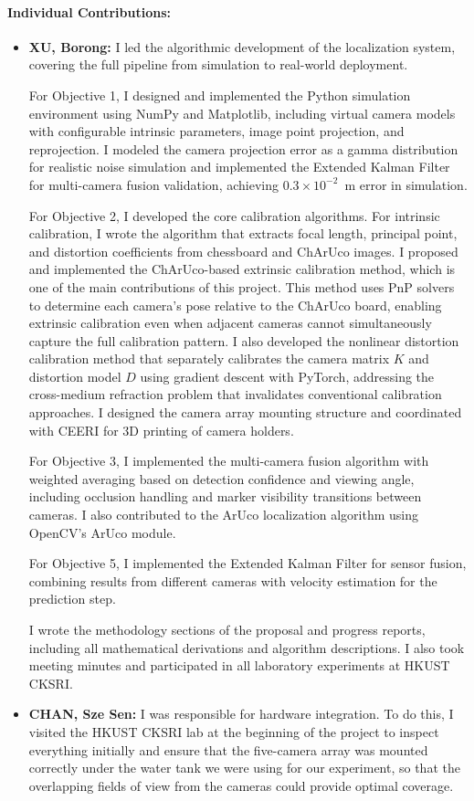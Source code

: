 \documentclass[11pt]{article}
\begin{document}
    \paragraph{Individual Contributions:}
    \begin{itemize}
        \item \textbf{XU, Borong:}
        I led the algorithmic development of the localization system, covering the full pipeline from simulation to real-world deployment.

        For Objective 1, I designed and implemented the Python simulation environment using NumPy and Matplotlib, including virtual camera models with configurable intrinsic parameters, image point projection, and reprojection. I modeled the camera projection error as a gamma distribution for realistic noise simulation and implemented the Extended Kalman Filter for multi-camera fusion validation, achieving $0.3\times10^{-2}$~m error in simulation.

        For Objective 2, I developed the core calibration algorithms. For intrinsic calibration, I wrote the algorithm that extracts focal length, principal point, and distortion coefficients from chessboard and ChArUco images. I proposed and implemented the ChArUco-based extrinsic calibration method, which is one of the main contributions of this project. This method uses PnP solvers to determine each camera's pose relative to the ChArUco board, enabling extrinsic calibration even when adjacent cameras cannot simultaneously capture the full calibration pattern. I also developed the nonlinear distortion calibration method that separately calibrates the camera matrix $K$ and distortion model $D$ using gradient descent with PyTorch, addressing the cross-medium refraction problem that invalidates conventional calibration approaches. I designed the camera array mounting structure and coordinated with CEERI for 3D printing of camera holders.

        For Objective 3, I implemented the multi-camera fusion algorithm with weighted averaging based on detection confidence and viewing angle, including occlusion handling and marker visibility transitions between cameras. I also contributed to the ArUco localization algorithm using OpenCV's ArUco module.

        For Objective 5, I implemented the Extended Kalman Filter for sensor fusion, combining results from different cameras with velocity estimation for the prediction step.

        I wrote the methodology sections of the proposal and progress reports, including all mathematical derivations and algorithm descriptions. I also took meeting minutes and participated in all laboratory experiments at HKUST CKSRI.
        \newpage
        \item \textbf{CHAN, Sze Sen:} 
        I was responsible for hardware integration. To do this, I visited the HKUST CKSRI lab at the beginning of the project to inspect everything initially and ensure that the five-camera array was mounted correctly under the water tank we were using for our experiment, so that the overlapping fields of view from the cameras could provide optimal coverage. 


\end{itemize}
\end{document}
